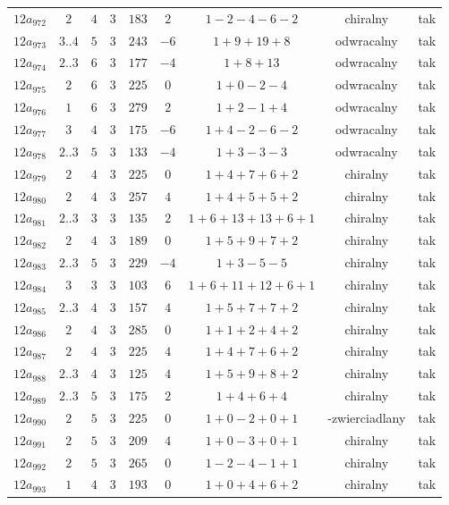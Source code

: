 \begin{longtable}{ccccccccc}
$12a_{972}$ & $2$ & $4$ & $3$ & $183$ & $2$ & $1-2-4-6-2$ & chiralny & tak \\
$12a_{973}$ & $3..4$ & $5$ & $3$ & $243$ & $-6$ & $1+9+19+8$ & odwracalny & tak \\
$12a_{974}$ & $2..3$ & $6$ & $3$ & $177$ & $-4$ & $1+8+13$ & odwracalny & tak \\
$12a_{975}$ & $2$ & $6$ & $3$ & $225$ & $0$ & $1+0-2-4$ & odwracalny & tak \\
$12a_{976}$ & $1$ & $6$ & $3$ & $279$ & $2$ & $1+2-1+4$ & odwracalny & tak \\
$12a_{977}$ & $3$ & $4$ & $3$ & $175$ & $-6$ & $1+4-2-6-2$ & odwracalny & tak \\
$12a_{978}$ & $2..3$ & $5$ & $3$ & $133$ & $-4$ & $1+3-3-3$ & odwracalny & tak \\
$12a_{979}$ & $2$ & $4$ & $3$ & $225$ & $0$ & $1+4+7+6+2$ & chiralny & tak \\
$12a_{980}$ & $2$ & $4$ & $3$ & $257$ & $4$ & $1+4+5+5+2$ & chiralny & tak \\
$12a_{981}$ & $2..3$ & $3$ & $3$ & $135$ & $2$ & $1+6+13+13+6+1$ & chiralny & tak \\
$12a_{982}$ & $2$ & $4$ & $3$ & $189$ & $0$ & $1+5+9+7+2$ & chiralny & tak \\
$12a_{983}$ & $2..3$ & $5$ & $3$ & $229$ & $-4$ & $1+3-5-5$ & chiralny & tak \\
$12a_{984}$ & $3$ & $3$ & $3$ & $103$ & $6$ & $1+6+11+12+6+1$ & chiralny & tak \\
$12a_{985}$ & $2..3$ & $4$ & $3$ & $157$ & $4$ & $1+5+7+7+2$ & chiralny & tak \\
$12a_{986}$ & $2$ & $4$ & $3$ & $285$ & $0$ & $1+1+2+4+2$ & chiralny & tak \\
$12a_{987}$ & $2$ & $4$ & $3$ & $225$ & $4$ & $1+4+7+6+2$ & chiralny & tak \\
$12a_{988}$ & $2..3$ & $4$ & $3$ & $125$ & $4$ & $1+5+9+8+2$ & chiralny & tak \\
$12a_{989}$ & $2..3$ & $5$ & $3$ & $175$ & $2$ & $1+4+6+4$ & chiralny & tak \\
$12a_{990}$ & $2$ & $5$ & $3$ & $225$ & $0$ & $1+0-2+0+1$ & -zwierciadlany & tak \\
$12a_{991}$ & $2$ & $5$ & $3$ & $209$ & $4$ & $1+0-3+0+1$ & chiralny & tak \\
$12a_{992}$ & $2$ & $5$ & $3$ & $265$ & $0$ & $1-2-4-1+1$ & chiralny & tak \\
$12a_{993}$ & $1$ & $4$ & $3$ & $193$ & $0$ & $1+0+4+6+2$ & chiralny & tak \\

\end{longtable}
